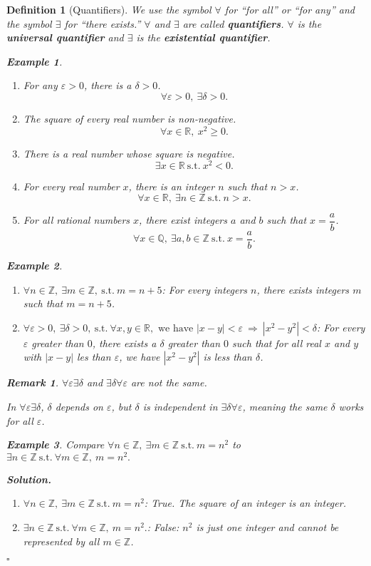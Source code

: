 \documentclass[12pt,a4paper]{article}
\newtheorem{df}{Definition}[subsection]
\newtheorem{eg}{Example}[subsection]
\newenvironment*{sol}{\par\indent\textbf{\textit{Solution. }}}{\hfill{$\square$}\par}
\newtheorem*{rmk}{\indent Remark}
\def\Z{{\mathbb{Z}}}
\def\R{{\mathbb{R}}}
\def\Q{{\mathbb{Q}}}
\def\st{\ \mathrm{s.t.}\ }
\begin{document}
\begin{df}[Quantifiers]
	We use the symbol $\forall$ for ``for all'' or ``for any'' and the symbol $\exists$ for ``there exists.'' $\forall$ and $\exists$ are called \textbf{quantifiers}. $\forall$ is the \textbf{universal quantifier} and $\exists$ is the \textbf{existential quantifier}.	 
	\begin{eg}
		\begin{enumerate}
			\item For any $\varepsilon>0$, there is a $\delta>0$.\[\forall\varepsilon>0,\ \exists\delta>0.\]
			\item The square of every real number is non-negative. \[\forall x\in\R,\ x^2\geq0.\]
			\item There is a real number whose square is negative. \[\exists x\in\R\st x^2<0.\]
			\item For every real number $x$, there is an integer $n$ such that $n>x$. \[\forall x\in\R,\ \exists n\in\Z\st n>x.\]
			\item For all rational numbers $x$, there exist integers $a$ and $b$ such that $x=\dfrac{a}{b}$. \[\forall x\in\Q,\ \exists a,b\in\Z\st x=\frac{a}{b}.\]
		\end{enumerate}	
	\end{eg}
	\begin{eg}
		\begin{enumerate}
			\item $\forall n\in\Z,\ \exists m\in\Z,\st m=n+5$: For every integers $n$, there exists integers $m$ such that $m=n+5$.
			\item $\forall\varepsilon>0,\ \exists\delta>0,\st\forall x,y\in\R,\text{ we have }|x-y|<\varepsilon\ \Longrightarrow\ |x^2-y^2|<\delta$: For every $\varepsilon$ greater than $0$, there exists a $\delta$ greater than $0$ such that for all real $x$ and $y$ with $|x-y|$ les than $\varepsilon$, we have $|x^2-y^2|$ is less than $\delta$. 
		\end{enumerate}
	\end{eg}
	\begin{rmk}
		$\forall\varepsilon\exists\delta$ and $\exists\delta\forall\varepsilon$ are not the same.
		
		In $\forall\varepsilon\exists\delta$, $\delta$ depends on $\varepsilon$, but $\delta$ is independent in $\exists\delta\forall\varepsilon$, meaning the same $\delta$ works for all $\varepsilon$.
		\begin{eg} 
			Compare $\forall n\in\Z,\ \exists m\in\Z\st m=n^2$ to  $\exists n\in\Z\st\forall m\in\Z,\ m=n^2.$
			\begin{sol}
				\begin{enumerate}
					\item $\forall n\in\Z,\ \exists m\in\Z\st m=n^2$: True. The square of an integer is an integer. 
					\item $\exists n\in\Z\st\forall m\in\Z,\ m=n^2.$: False: $n^2$ is just one integer and cannot be represented by all $m\in\Z$.
				\end{enumerate}
			\end{sol}
		\end{eg}
	\end{rmk}
\end{df}
\end{document}
